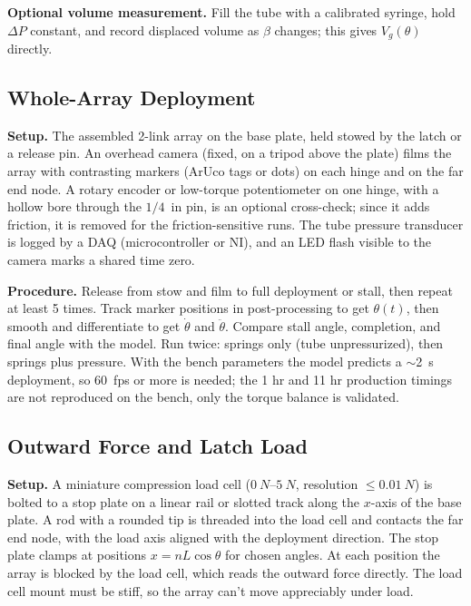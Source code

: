 \documentclass[11pt]{article}
\begin{document}
\textbf{Optional volume measurement.} Fill the tube with a calibrated syringe, hold $\Delta P$ constant,
and record displaced volume as $\beta$ changes; this gives $V_g(\theta)$ directly.

\subsection{Whole-Array Deployment}

\textbf{Setup.} The assembled 2-link array on the base plate, held stowed by the latch or a release pin.
An overhead camera (fixed, on a tripod above the plate) films the array with contrasting markers
(ArUco tags or dots) on each hinge and on the far end node. A rotary encoder or low-torque
potentiometer on one hinge, with a hollow bore through the $1/4$~in pin, is an optional cross-check;
since it adds friction, it is removed for the friction-sensitive runs. The tube pressure transducer
is logged by a DAQ (microcontroller or NI), and an LED flash visible to the camera marks a shared time
zero.

\textbf{Procedure.} Release from stow and film to full deployment or stall, then repeat at least 5
times. Track marker positions in post-processing to get $\theta(t)$, then smooth and differentiate to
get $\dot\theta$ and $\ddot\theta$. Compare stall angle, completion, and final angle with the model.
Run twice: springs only (tube unpressurized), then springs plus pressure. With the bench parameters
the model predicts a $\sim$\SI{2}{s} deployment, so \SI{60}{fps} or more is needed; the 1 hr and 11 hr
production timings are not reproduced on the bench, only the torque balance is validated.

\subsection{Outward Force and Latch Load}

\textbf{Setup.} A miniature compression load cell ($\SIrange{0}{5}{N}$, resolution
$\le\SI{0.01}{N}$) is bolted to a stop plate on a linear rail or slotted track along the $x$-axis of the
base plate. A rod with a rounded tip is threaded into the load cell and contacts the far end node, with
the load axis aligned with the deployment direction. The stop plate clamps at positions $x=nL\cos\theta$
for chosen angles. At each position the array is blocked by the load cell, which reads the outward force
directly. The load cell mount must be stiff, so the array can't move appreciably under load.
\end{document}

